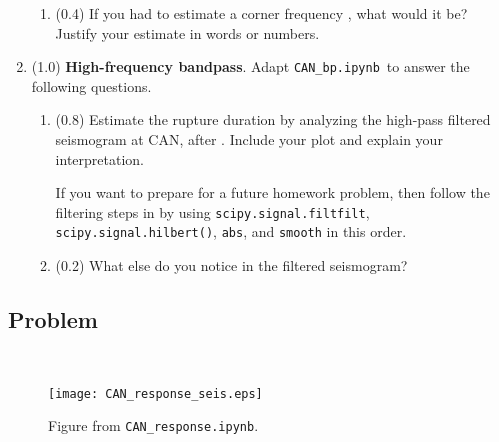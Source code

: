 \documentclass[11pt,titlepage,fleqn]{article}
\newcommand{\tfileresponse}{{\tt CAN\_response.ipynb}}
\newcommand{\tfilebp}{{\tt CAN\_bp.ipynb}}
\begin{document}
\begin{enumerate}
\begin{enumerate}
\item (0.4) If you had to estimate a corner frequency \citep[][p.~267]{SteinWysession}, what would it be? Justify your estimate in words or numbers.
\end{enumerate}


\item (1.0) {\bf High-frequency bandpass}. Adapt \tfilebp\ to answer the following questions.
%
\begin{enumerate}
\item (0.8) Estimate the rupture duration by analyzing the high-pass filtered seismogram at CAN, after \citet{Ni2005}. Include your plot and explain your interpretation.

If you want to prepare for a future homework problem, then follow the filtering steps in \citet{Ni2005} by using \verb+scipy.signal.filtfilt+, \verb+scipy.signal.hilbert()+, \verb+abs+, and \verb+smooth+ in this order.

\item (0.2) What else do you notice in the filtered seismogram?
\end{enumerate}

\end{enumerate}


\subsection*{Problem} \howmuchtime\

\pagebreak




%

\begin{figure}
\hspace{-1cm}
\texttt{[image: CAN\_response\_seis.eps]}
\caption[]
{{
Figure from \tfileresponse.
}}
\label{fig:seis}
\end{figure}

\end{document}
